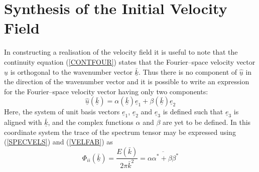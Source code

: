 \documentclass[dvips]{article}
\begin{document}
\section{Synthesis of the Initial Velocity Field}
In constructing a realisation of the velocity field it is useful to note
that the continuity equation (\ref{CONTFOUR}) states that
the Fourier--space velocity vector $\underline{\hat{u}}$ is orthogonal
to the wavenumber vector $\underline{\bar{k}}$.  Thus there is no component of
$\underline{\hat{u}}$ in the direction of the wavenumber vector and it
is possible to write an expression for the Fourier--space velocity vector
having only two components:
\begin{equation}
\underline{\hat{u}}(\underline{\bar{k}}) = \alpha(\underline{\bar{k}})\underline{e}_{1}
+ \beta(\underline{\bar{k}})\underline{e}_{2}
\label{VELFAB}
\end{equation}
Here, the system of unit basis vectors $\underline{e}_{1}$,
$\underline{e}_{2}$ and $\underline{e}_{3}$ is defined
such that $\underline{e}_{3}$ is aligned with $\underline{\bar{k}}$, and the
complex functions $\alpha$ and $\beta$ are yet to be defined.
In this coordinate system the trace of the spectrum tensor may be expressed
using (\ref{SPECVELS}) and (\ref{VELFAB}) as
\begin{equation}
\Phi_{ii}(\underline{\bar{k}}) = \frac{E(\bar{k})}{2\pi \bar{k}^{2}}
 = \overline{\alpha\alpha^{*} + \beta\beta^{*}}
\label{SPECBAR}
\end{equation}
\end{document}
